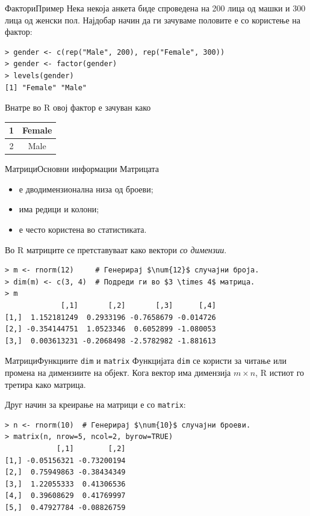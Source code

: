 \documentclass[hyperref={unicode}, xcolor={svgnames, table},
usepdftitle=false]{beamer}
\theoremstyle{remark}
\begin{document}
\begin{frame}[fragile]{Фактори}{Пример}
  Нека некоја анкета биде спроведена на \num{200} лица од машки и \num{300} лица
  од женски пол.  Најдобар начин да ги зачуваме половите е со користење на
  фактор:
\begin{verbatim}
> gender <- c(rep("Male", 200), rep("Female", 300))
> gender <- factor(gender)
> levels(gender)
[1] "Female" "Male"
\end{verbatim}
  Внатре во R овој фактор е зачуван како
  \begin{table}[b]
    \centering
    \begin{tabular}{| c | c |}
      \hline
      1 & Female \\ \hline
      2 & Male \\
      \hline
    \end{tabular}
  \end{table}
\end{frame}

\begin{frame}[fragile]{Матрици}{Основни информации}
  Матрицата
  \begin{itemize}
  \item е дводимензионална низа од броеви;
  \item има редици и колони;
  \item е често користена во статистиката.
  \end{itemize}

  Во R матриците се претставуваат како вектори \emph{со димензии}.
\begin{verbatim}
> m <- rnorm(12)     # Генерирај $\num{12}$ случајни броја.
> dim(m) <- c(3, 4)  # Подреди ги во $3 \times 4$ матрица.
> m
             [,1]       [,2]       [,3]      [,4]
[1,]  1.152181249  0.2933196 -0.7658679 -0.014726
[2,] -0.354144751  1.0523346  0.6052899 -1.080053
[3,]  0.003613231 -0.2068498 -2.5782982 -1.881613
\end{verbatim}
\end{frame}

\begin{frame}[fragile]{Матрици}{Функциите \texttt{dim} и \texttt{matrix}}
  Функцијата \texttt{dim} се користи за читање или промена на димензиите
  на објект.  Кога вектор има димензија \(m \times n\), R истиот го третира како
  матрица.

  Друг начин за креирање на матрици е со \texttt{matrix}:
\begin{verbatim}
> n <- rnorm(10)  # Генерирај $\num{10}$ случајни броеви.
> matrix(n, nrow=5, ncol=2, byrow=TRUE)
            [,1]        [,2]
[1,] -0.05156321 -0.73200194
[2,]  0.75949863 -0.38434349
[3,]  1.22055333  0.41306536
[4,]  0.39608629  0.41769997
[5,]  0.47927784 -0.08826759
\end{verbatim}
\end{frame}
\end{document}
